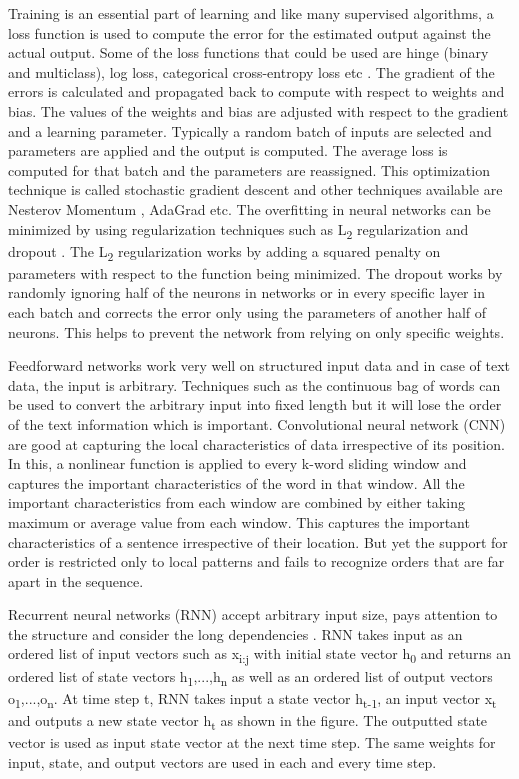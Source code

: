 \documentclass[a4paper, 11pt]{article}
\begin{document}
Training is an essential part of learning and like many supervised algorithms, a loss function is used to compute the error for the estimated output against the actual output. Some of the loss functions that could be used are hinge (binary and multiclass), log loss, categorical cross-entropy loss etc \cite{Goldberg2016}. The gradient of the errors is calculated and propagated back to compute with respect to weights and bias. The values of the weights and bias are adjusted with respect to the gradient and a learning parameter. Typically a random batch of inputs are selected and parameters are applied and the output is computed. The average loss is computed for that batch and the parameters are reassigned. This optimization technique is called stochastic gradient descent \cite{Bottou2012} and other techniques available are Nesterov Momentum \cite{Sutskever2013}, AdaGrad \cite{Duchi2011} etc. The overfitting in neural networks can be minimized by using regularization techniques such as L\textsubscript{2} regularization and dropout \cite{Hinton2012}. The L\textsubscript{2} regularization works by adding a squared penalty on parameters with respect to the function being minimized. The dropout works by randomly ignoring half of the neurons in networks or in every specific layer in each batch and corrects the error only using the parameters of another half of neurons. This helps to prevent the network from relying on only specific weights. 

Feedforward networks work very well on structured input data and in case of text data, the input is arbitrary. Techniques such as the continuous bag of words \cite{DBLP:journals/corr/abs-1301-3781} can be used to convert the arbitrary input into fixed length but it will lose the order of the text information which is important. Convolutional neural network (CNN) \cite{Bengio1997} are good at capturing the local characteristics of data irrespective of its position. In this, a nonlinear function is applied to every k-word sliding window and captures the important characteristics of the word in that window. All the important characteristics from each window are combined by either taking maximum or average value from each window. This captures the important characteristics of a sentence irrespective of their location. But yet the support for order is restricted only to local patterns and fails to recognize orders that are far apart in the sequence.

Recurrent neural networks (RNN) accept arbitrary input size, pays attention to the structure and consider the long dependencies \cite{Elman}. RNN takes input as an ordered list of input vectors such as x\textsubscript{i:j} with initial state vector h\textsubscript{0} and returns an ordered list of state vectors h\textsubscript{1},...,h\textsubscript{n} as well as an ordered list of output vectors o\textsubscript{1},...,o\textsubscript{n}. At time step t, RNN takes input a state vector h\textsubscript{t-1}, an input vector x\textsubscript{t} and outputs a new state vector h\textsubscript{t} as shown in the figure. The outputted state vector is used as input state vector at the next time step. The same weights for input, state, and output vectors are used in each and every time step.   
\end{document}
